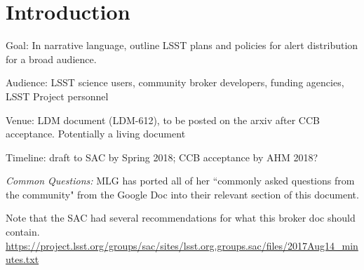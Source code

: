 \section{Introduction}\label{sec:introduction}

Goal: In narrative language, outline LSST plans and policies for alert distribution for a broad audience.

Audience: LSST science users, community broker developers, funding agencies, LSST Project personnel

Venue:  LDM document (LDM-612), to be posted on the arxiv after CCB acceptance. Potentially a living document

Timeline: draft to SAC by Spring 2018; CCB acceptance by AHM 2018?

{\it Common Questions:} MLG has ported all of her ``commonly asked questions from the community" from the Google Doc into their relevant section of this document.

Note that the SAC had several recommendations for what this broker doc should contain.
\url{https://project.lsst.org/groups/sac/sites/lsst.org.groups.sac/files/2017Aug14_minutes.txt}

